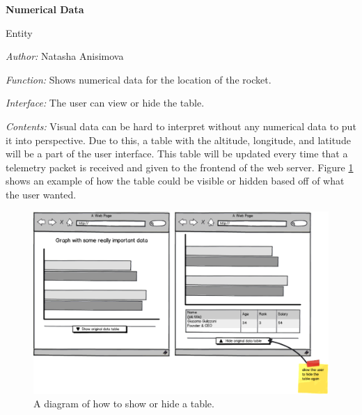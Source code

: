 \documentclass[10pt,draftclsnofoot,onecolumn]{IEEEtran}
\newcommand{\newinterface}[5]{
	\begin{minipage}{\linewidth}
		\noindent\textbf{#2}
		
		\noindent Entity
		
		\noindent\textit{Author:} {#1}
		
		\noindent\textit{Function:} {#3}
		
		\noindent\textit{Interface:} {#4}		
		
		\noindent\textit{Contents:} {#5}
		\vspace{.5cm}
	\end{minipage}
}
\begin{document}
\newpage
	\newinterface
	{Natasha Anisimova}
	{Numerical Data}
	{Shows numerical data for the location of the rocket.}
	{The user can view or hide the table.}
	{
		Visual data can be hard to interpret without any numerical data to put it into perspective. Due to this, a table with the altitude, longitude, and latitude will be a part of the user interface. This table will be updated every time that a telemetry packet is received and given to the frontend of the web server.
		Figure \ref{fig:3} shows an example of how the table could be visible or hidden based off of what the user wanted.
	}
	\begin{center}
	\begin{figure}
		\centering\includegraphics[width=\linewidth]{hideshowtable.eps}
		\caption{A diagram of how to show or hide a table.}
		\label{fig:3}
	\end{figure}
	\end{center}
	\clearpage
	\newpage
\end{document}
